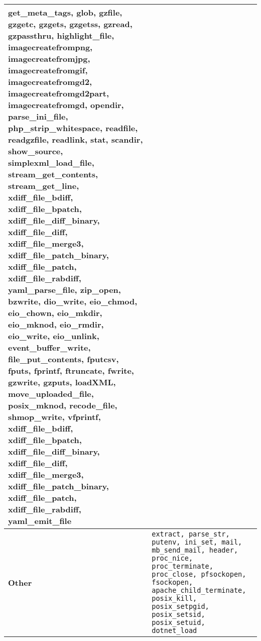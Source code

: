 \begin{table*}[t]
\begin{tabular}{|l|p{14cm}|}
{    get\_meta\_tags, glob, gzfile, gzgetc, gzgets, gzgetss, gzread, gzpassthru, highlight\_file, imagecreatefrompng, imagecreatefromjpg, imagecreatefromgif, imagecreatefromgd2, 
    imagecreatefromgd2part, imagecreatefromgd, opendir, parse\_ini\_file, php\_strip\_whitespace, readfile, readgzfile, readlink, stat, scandir, show\_source, simplexml\_load\_file, stream\_get\_contents, 
    stream\_get\_line, xdiff\_file\_bdiff, xdiff\_file\_bpatch, xdiff\_file\_diff\_binary, xdiff\_file\_diff, xdiff\_file\_merge3, xdiff\_file\_patch\_binary, xdiff\_file\_patch, xdiff\_file\_rabdiff, yaml\_parse\_file, zip\_open,
    bzwrite, dio\_write, eio\_chmod, eio\_chown, eio\_mkdir, eio\_mknod, eio\_rmdir, eio\_write, eio\_unlink, event\_buffer\_write, file\_put\_contents, fputcsv, fputs, fprintf, ftruncate, fwrite, 
    gzwrite, gzputs, loadXML, move\_uploaded\_file, posix\_mknod, recode\_file, shmop\_write, vfprintf, xdiff\_file\_bdiff, xdiff\_file\_bpatch, xdiff\_file\_diff\_binary, xdiff\_file\_diff, xdiff\_file\_merge3, 
    xdiff\_file\_patch\_binary, xdiff\_file\_patch, xdiff\_file\_rabdiff, yaml\_emit\_file} \\ \hline 
    \textbf{Other} & \texttt{extract, parse\_str, putenv, ini\_set, mail, mb\_send\_mail, header, proc\_nice, proc\_terminate, proc\_close, pfsockopen, fsockopen, 
    apache\_child\_terminate, posix\_kill, posix\_setpgid, posix\_setsid, posix\_setuid, dotnet\_load} \\ \hline 
\end{tabular}
\end{table*}